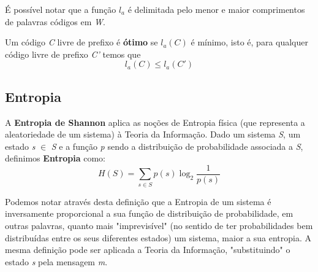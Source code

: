 É possível notar que a função $l_a$ é delimitada pelo menor e maior comprimentos de palavras códigos em \emph{W}.  

Um código \emph{C} livre de prefixo é \textbf{ótimo} se $l_a(C)$ é mínimo, isto é, para qualquer código livre de prefixo \emph{C'} temos que
\begin{equation*}
l_a(C) \leq l_a(C')
\end{equation*}

\subsection{Entropia}
A \textbf{Entropia de Shannon} aplica as noções de Entropia física (que representa a aleatoriedade de um sistema) à Teoria da Informação. Dado um sistema \emph{S}, um estado \emph{s} $\in$ \emph{S} e a função \emph{p} sendo a distribuição de probabilidade associada a \emph{S}, definimos \textbf{Entropia} como:
\begin{equation*}
H(S) = \sum_{s \in S}^{} p(s) \log_2 \frac{1}{p(s)}
\end{equation*}

Podemos notar através desta definição que a Entropia de um sistema é inversamente proporcional a sua função de distribuição de probabilidade, em outras palavras, quanto mais "imprevisível" (no sentido de ter probabilidades bem distribuídas entre os seus diferentes estados) um sistema, maior a sua entropia.
A mesma definição pode ser aplicada a Teoria da Informação, "substituindo" o estado \emph{s} pela mensagem \emph{m}.




